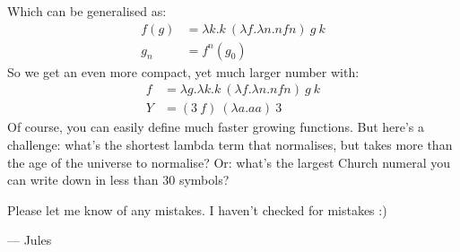 Which can be generalised as:
\begin{align*}
  f(g) &= \lambda k. k\ (\lambda f. \lambda n. n f n)\ g\ k\\
  g_n &= f^n(g_0)
\end{align*}
So we get an even more compact, yet much larger number with:
\begin{align*}
  f &= \lambda g. \lambda k. k\ (\lambda f. \lambda n. n f n)\ g\ k\\
  Y &= (3\ f)\ (\lambda a. a a)\ 3
\end{align*}
Of course, you can easily define much faster growing functions. But here's a challenge: what's the shortest lambda term that normalises, but takes more than the age of the universe to normalise? Or: what's the largest Church numeral you can write down in less than 30 symbols?

Please let me know of any mistakes. I haven't checked for mistakes :)

--- Jules

